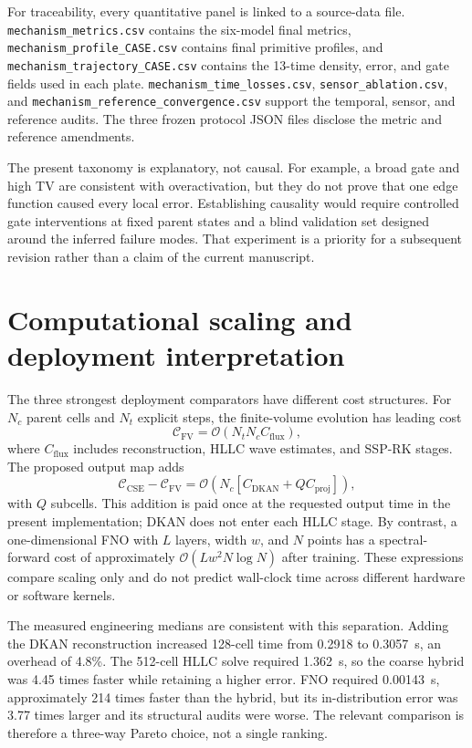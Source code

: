 \documentclass[10pt,twocolumn]{article}
\begin{document}
For traceability, every quantitative panel is linked to a source-data file. \texttt{mechanism\_metrics.csv} contains the six-model final metrics, \texttt{mechanism\_profile\_CASE.csv} contains final primitive profiles, and \texttt{mechanism\_trajectory\_CASE.csv} contains the 13-time density, error, and gate fields used in each plate. \texttt{mechanism\_time\_losses.csv}, \texttt{sensor\_ablation.csv}, and \texttt{mechanism\_reference\_convergence.csv} support the temporal, sensor, and reference audits. The three frozen protocol JSON files disclose the metric and reference amendments.

The present taxonomy is explanatory, not causal. For example, a broad gate and high TV are consistent with overactivation, but they do not prove that one edge function caused every local error. Establishing causality would require controlled gate interventions at fixed parent states and a blind validation set designed around the inferred failure modes. That experiment is a priority for a subsequent revision rather than a claim of the current manuscript.

\section{Computational scaling and deployment interpretation}

The three strongest deployment comparators have different cost structures. For $N_c$ parent cells and $N_t$ explicit steps, the finite-volume evolution has leading cost
\begin{equation}
 \mathcal C_{\mathrm{FV}}=\mathcal O(N_tN_cC_{\mathrm{flux}}),
\end{equation}
where $C_{\mathrm{flux}}$ includes reconstruction, HLLC wave estimates, and SSP-RK stages. The proposed output map adds
\begin{equation}
 \mathcal C_{\mathrm{CSE}}-\mathcal C_{\mathrm{FV}}
 =\mathcal O\!\left(N_c[C_{\mathrm{DKAN}}+QC_{\mathrm{proj}}]\right),
\end{equation}
with $Q$ subcells. This addition is paid once at the requested output time in the present implementation; DKAN does not enter each HLLC stage. By contrast, a one-dimensional FNO with $L$ layers, width $w$, and $N$ points has a spectral-forward cost of approximately $\mathcal O(Lw^2N\log N)$ after training. These expressions compare scaling only and do not predict wall-clock time across different hardware or software kernels.

The measured engineering medians are consistent with this separation. Adding the DKAN reconstruction increased 128-cell time from 0.2918 to 0.3057~s, an overhead of 4.8\%. The 512-cell HLLC solve required 1.362~s, so the coarse hybrid was 4.45 times faster while retaining a higher error. FNO required 0.00143~s, approximately 214 times faster than the hybrid, but its in-distribution error was 3.77 times larger and its structural audits were worse. The relevant comparison is therefore a three-way Pareto choice, not a single ranking.
\end{document}
